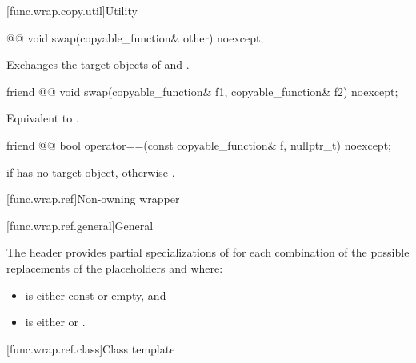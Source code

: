 [func.wrap.copy.util]{Utility}

%
\begin{itemdecl}
@@ void swap(copyable_function& other) noexcept;
\end{itemdecl}

\begin{itemdescr}
\pnum
\effects
Exchanges the target objects of  and .
\end{itemdescr}

%
\begin{itemdecl}
friend @@ void swap(copyable_function& f1, copyable_function& f2) noexcept;
\end{itemdecl}

\begin{itemdescr}
\pnum
\effects
Equivalent to .
\end{itemdescr}

%
\begin{itemdecl}
friend @@ bool operator==(const copyable_function& f, nullptr_t) noexcept;
\end{itemdecl}

\begin{itemdescr}
\pnum
\returns
{} if  has no target object, otherwise .
\end{itemdescr}

[func.wrap.ref]{Non-owning wrapper}

[func.wrap.ref.general]{General}

\pnum
The header provides partial specializations of 
for each combination of the possible replacements of
the placeholders \cv{} and  where:

\begin{itemize}
\item \cv{} is either const or empty, and
\item {} is either  or .
\end{itemize}

[func.wrap.ref.class]{Class template }

